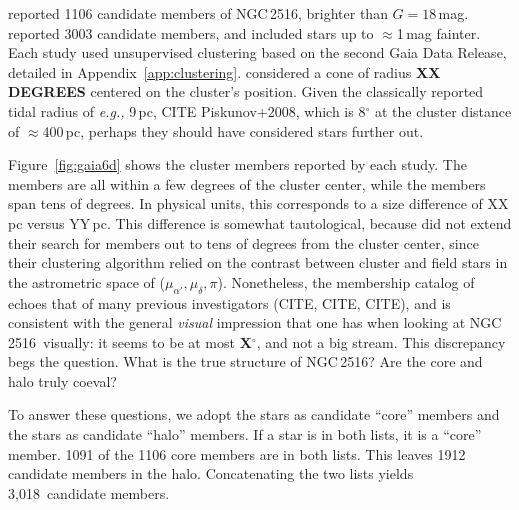\documentclass[12pt,twocolumn,tighten]{aastex63}
\newcommand{\cn}{NGC\,2516} %
\newcommand{\nkinematic}{3{,}018\ } %
\begin{document}
 reported 1106 candidate members of
\cn, brighter than $G=18$\,mag.  \citet{kounkel_untangling_2019}
reported 3003 candidate members, and included stars up to
$\approx$1\,mag fainter.  Each study used unsupervised clustering
based on the second Gaia Data Release, detailed in
Appendix~\ref{app:clustering}.
 considered a cone of radius {\bf
XX DEGREES} centered on the cluster's position.
Given the classically reported tidal radius of {\it e.g.,} 9\,pc, CITE
Piskunov+2008, which is 8$^\circ$ at the cluster distance of
$\approx$400\,pc, perhaps they should have considered stars further
out.


Figure~\ref{fig:gaia6d} shows the cluster members reported by each
study.  The  members are all within
a few degrees of the cluster center, while the
 members span tens of degrees.  In
physical units, this corresponds to a size difference of XX\,pc versus
YY\,pc.  This difference is somewhat tautological, because
 did not extend their search for
members out to tens of degrees from the cluster center, since their
clustering algorithm relied on the contrast between cluster and field
stars in the astrometric space of ($\mu_{\alpha'}, \mu_\delta, \pi$).
Nonetheless, the membership catalog of 
echoes that of many previous investigators (CITE, CITE, CITE), and is
consistent with the general {\it visual} impression that one has when
looking at \cn\ visually: it seems to be at most {\bf X$^\circ$}, and
not a big stream.
This discrepancy begs the question.  What is the true structure of
\cn?  Are the core and halo truly coeval?

To answer these questions, we adopt the
 stars as candidate ``core''
members and the  stars as
candidate ``halo'' members.  If a star is in both lists, it is a
``core'' member.  1091 of the 1106 core members are in both lists.
This leaves 1912 candidate members in the halo.
Concatenating the two lists yields \nkinematic candidate members.
\end{document}
